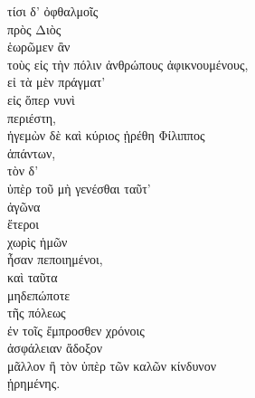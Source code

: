 {\large
\begin{greek}
\noindent τίσι δ' ὀφθαλμοῖς \\
\tabto{2em} πρὸς Διὸς \\
ἑωρῶμεν ἂν \\
τοὺς εἰς τὴν πόλιν ἀνθρώπους ἀφικνουμένους, \\
\tabto{2em} εἰ τὰ μὲν πράγματ' \\
\tabto{4em} εἰς ὅπερ νυνὶ \\
\tabto{2em} περιέστη, \\
\tabto{2em} ἡγεμὼν δὲ καὶ κύριος ᾑρέθη Φίλιππος \\
\tabto{4em} ἁπάντων, \\
\tabto{2em} τὸν δ' \\
\tabto{4em} ὑπὲρ τοῦ μὴ γενέσθαι ταῦτ' \\
\tabto{2em} ἀγῶνα \\
\tabto{2em} ἕτεροι \\
\tabto{4em} χωρὶς ἡμῶν \\
\tabto{2em} ἦσαν πεποιημένοι, \\
\tabto{2em} καὶ ταῦτα\\
\tabto{4em} μηδεπώποτε \\
\tabto{2em} τῆς πόλεως \\
\tabto{4em} ἐν τοῖς ἔμπροσθεν χρόνοις \\
\tabto{2em} ἀσφάλειαν ἄδοξον \\
\tabto{2em} μᾶλλον ἢ τὸν ὑπὲρ τῶν καλῶν κίνδυνον \\
\tabto{2em} ᾑρημένης.\\

\end{greek}
}

